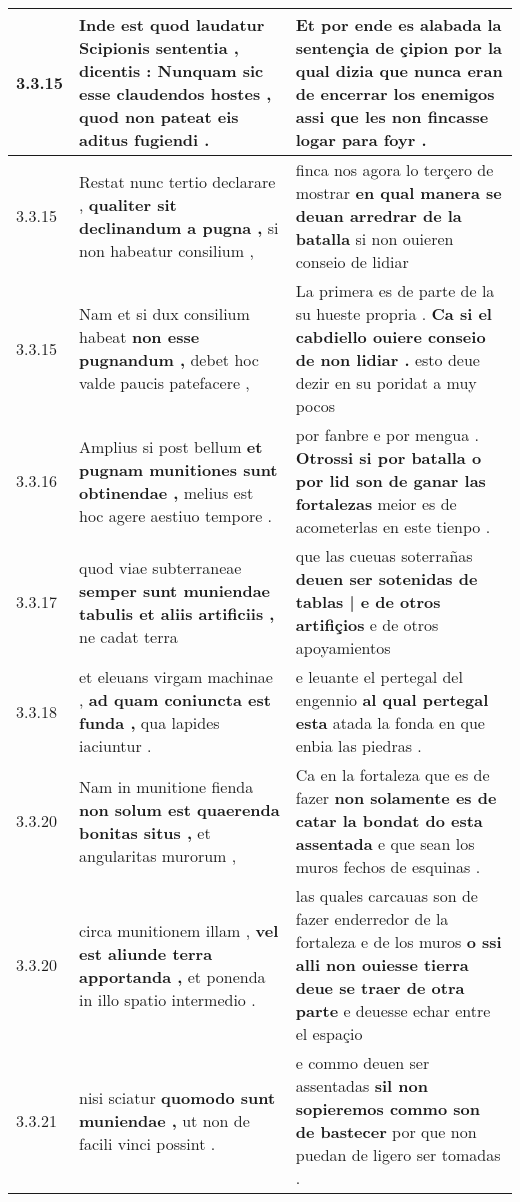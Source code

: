 \begin{tabular}{|p{1cm}|p{6.5cm}|p{6.5cm}|}
3.3.15 & Inde est quod laudatur Scipionis sententia , dicentis : \textbf{ Nunquam sic esse claudendos hostes , } quod non pateat eis aditus fugiendi . & Et por ende es alabada la sentençia de çipion \textbf{ por la qual dizia que nunca eran de encerrar los enemigos } assi que les non fincasse logar para foyr . \\\hline
3.3.15 & Restat nunc tertio declarare , \textbf{ qualiter sit declinandum a pugna , } si non habeatur consilium , & finca nos agora lo terçero de mostrar \textbf{ en qual manera se deuan arredrar de la batalla } si non ouieren conseio de lidiar \\\hline
3.3.15 & Nam et si dux consilium habeat \textbf{ non esse pugnandum , } debet hoc valde paucis patefacere , & La primera es de parte de la su hueste propria . \textbf{ Ca si el cabdiello ouiere conseio de non lidiar . } esto deue dezir en su poridat a muy pocos \\\hline
3.3.16 & Amplius si post bellum \textbf{ et pugnam munitiones sunt obtinendae , } melius est hoc agere aestiuo tempore . & por fanbre e por mengua . \textbf{ Otrossi si por batalla o por lid son de ganar las fortalezas } meior es de acometerlas en este tienpo . \\\hline
3.3.17 & quod viae subterraneae \textbf{ semper sunt muniendae tabulis et aliis artificiis , } ne cadat terra & que las cueuas soterrañas \textbf{ deuen ser sotenidas de tablas | e de otros artifiçios } e de otros apoyamientos \\\hline
3.3.18 & et eleuans virgam machinae , \textbf{ ad quam coniuncta est funda , } qua lapides iaciuntur . & e leuante el pertegal del engennio \textbf{ al qual pertegal esta } atada la fonda en que enbia las piedras . \\\hline
3.3.20 & Nam in munitione fienda \textbf{ non solum est quaerenda bonitas situs , } et angularitas murorum , & Ca en la fortaleza que es de fazer \textbf{ non solamente es de catar la bondat do esta assentada } e que sean los muros fechos de esquinas . \\\hline
3.3.20 & circa munitionem illam , \textbf{ vel est aliunde terra apportanda , } et ponenda in illo spatio intermedio . & las quales carcauas son de fazer enderredor de la fortaleza e de los muros \textbf{ o ssi alli non ouiesse tierra deue se traer de otra parte } e deuesse echar entre el espaçio \\\hline
3.3.21 & nisi sciatur \textbf{ quomodo sunt muniendae , } ut non de facili vinci possint . & e commo deuen ser assentadas \textbf{ sil non sopieremos commo son de bastecer } por que non puedan de ligero ser tomadas . \\\hline

\end{tabular}
